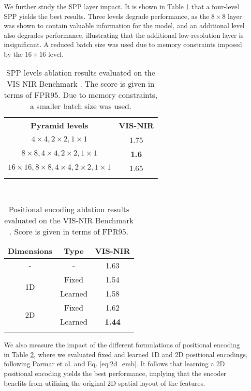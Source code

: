 \documentclass[10pt,journal]{IEEEtran}\usepackage{amsfonts}
\begin{document}
We further study the SPP layer impact. It is shown in Table \ref {table:spp_ablation} that a four-level SPP yields the best results. Three
levels degrade performance, as the $8\times 8$ layer was shown to contain
valuable information for the model, and an additional level also degrades
performance, illustrating that the additional low-resolution layer is
insignificant. A reduced batch size was used due to memory constraints
imposed by the $16\times 16$ level.
\begin{table}[tbh]
\centering
\begin{tabular}{cc}
\toprule Pyramid levels & VIS-NIR \\
\midrule $4\times 4, 2\times 2, 1\times 1$ & 1.75 \\
$8\times 8, 4\times 4, 2\times 2, 1\times 1$ & \textbf{1.6} \\
$16\times 16, 8\times 8, 4\times 4, 2\times 2, 1\times 1$ & 1.65 \\
\bottomrule &
\end{tabular}\caption{SPP levels ablation results evaluated on the VIS-NIR Benchmark
\protect\cite{SiameseCrossSpectral}. The score is given in terms of FPR95.
Due to memory constraints, a smaller batch size was used.}
\label{table:spp_ablation}
\end{table}
\begin{table}[tbh]
\centering
{\setlength{\tabcolsep}{3pt} }
\par
{\
\begin{tabular}{ccc}
\toprule Dimensions & Type & VIS-NIR \\
\midrule - & - & 1.63 \\
\multirow{ 2}{*}{1D} & Fixed & 1.54 \\
& Learned & 1.58 \\
\multirow{ 2}{*}{2D} & Fixed & 1.62 \\
& Learned & \textbf{1.44} \\
\bottomrule &  &
\end{tabular}}
\caption{Positional encoding ablation results evaluated on the VIS-NIR
Benchmark \protect\cite{SiameseCrossSpectral}. Score is given in terms of
FPR95.}
\label{table:ablation_pos}
\end{table}

We also measure the impact of the different formulations of positional
encoding in Table \ref{table:ablation_pos}, where we evaluated fixed and
learned 1D and 2D positional encodings, following Parmar et al. \cite {ImageTransformer} and Eq. \ref{eq:2d_emb}. It follows that learning a 2D
positional encoding yields the best performance, implying that the encoder
benefits from utilizing the original 2D spatial layout of the features.
\end{document}
